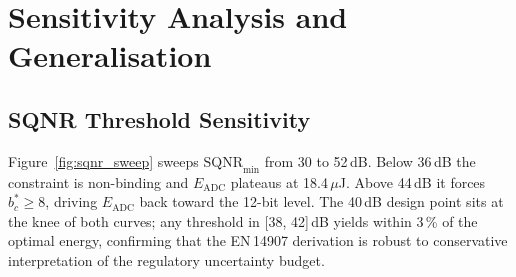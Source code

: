 \documentclass[12pt,a4paper]{article}
\begin{document}
\section{Sensitivity Analysis and Generalisation}
\label{sec:sensitivity}


\subsection{SQNR Threshold Sensitivity}
\label{sec:sens_sqnr}

Figure~\ref{fig:sqnr_sweep} sweeps $\mathrm{SQNR}_\mathrm{min}$ from
30 to 52\,dB.
Below 36\,dB the constraint is non-binding and $E_\mathrm{ADC}$
plateaus at 18.4\,$\mu$J.
Above 44\,dB it forces $b_c^*\geq8$, driving $E_\mathrm{ADC}$ back
toward the 12-bit level.
The 40\,dB design point sits at the knee of both curves; any
threshold in [38, 42]\,dB yields within 3\,\% of the optimal energy,
confirming that the EN\,14907 derivation is robust to conservative
interpretation of the regulatory uncertainty budget.
\end{document}
